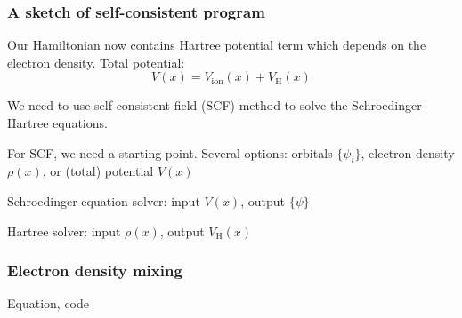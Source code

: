\begin{frame}
\frametitle{A sketch of self-consistent program}

Our Hamiltonian now contains Hartree potential term which depends on the electron density.
Total potential:
\begin{equation*}
V(x) = V_{\mathrm{ion}}(x) + V_{\mathrm{H}}(x)
\end{equation*}

We need to use self-consistent field (SCF) method to solve the Schroedinger-Hartree
equations.

For SCF, we need a starting point. Several options: orbitals $\{ \psi_{i} \}$,
electron density $\rho(x)$, or (total) potential $V(x)$

Schroedinger equation solver: input $V(x)$, output $\{ \psi \}$

Hartree solver: input $\rho(x)$, output $V_{\mathrm{H}}(x)$

\end{frame}


\begin{frame}
\frametitle{Electron density mixing}

Equation, code

\end{frame}